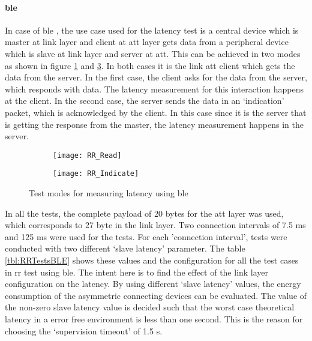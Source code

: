 \paragraph{\gls{ble} }
In case of \gls{ble} , the use case used for the latency test is a central device which is master at link layer and client at \gls{att} layer gets data from a peripheral device which is slave at link layer and server at \gls{att}. This can be achieved in two modes as shown in figure \ref{fig:RR_Read} and \ref{fig:RR_Indicate}. In both cases it is the link \gls{att} client which gets the data from the server. In the first case, the client asks for the data from the server, which responds with data. The latency measurement for this interaction happens at the client. In the second case, the server sends the data in an `indication' packet, which is acknowledged by the client. In this case since it is the server that is getting the response from the master, the latency measurement happens in the server.

\begin{figure}[h]
	\vspace{10 pt}
	\begin{subfigure}[t]{0.49\linewidth}
		\centering
		\texttt{[image: RR\_Read]}
		\label{fig:RR_Read}
	\end{subfigure}
	\begin{subfigure}[t]{0.49\linewidth}
		\centering
		\texttt{[image: RR\_Indicate]}
		\label{fig:RR_Indicate}
	\end{subfigure}
	\caption{Test modes for measuring latency using \gls{ble}}
\end{figure}

In all the tests, the complete payload of 20 bytes for the \gls{att} layer was used, which corresponds to 27 byte in the link layer. Two connection intervals of 7.5 ms and 125 ms were used for the tests. For each 'connection interval', tests were conducted with two different `slave latency' parameter. The table \ref{tbl:RRTestsBLE} shows these values and the configuration for all the test cases in \gls{rr} test using \gls{ble}. The intent here is to find the effect of the link layer configuration on the latency. By using different `slave latency' values, the energy consumption of the asymmetric connecting devices can be evaluated. The value of the non-zero slave latency value is decided such that the worst case theoretical latency in a error free environment is less than one second. This is the reason for choosing the `supervision timeout' of 1.5 s.

